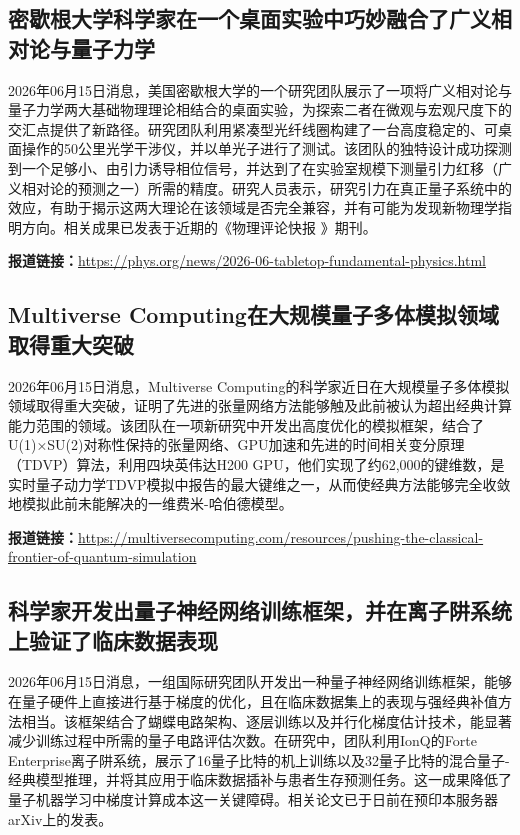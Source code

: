 \documentclass[12pt,a4paper]{ctexart}
\begin{document}
\subsection{ 密歇根大学科学家在一个桌面实验中巧妙融合了广义相对论与量子力学 }

2026年06月15日消息，美国密歇根大学的一个研究团队展示了一项将广义相对论与量子力学两大基础物理理论相结合的桌面实验，为探索二者在微观与宏观尺度下的交汇点提供了新路径。研究团队利用紧凑型光纤线圈构建了一台高度稳定的、可桌面操作的50公里光学干涉仪，并以单光子进行了测试。该团队的独特设计成功探测到一个足够小、由引力诱导相位信号，并达到了在实验室规模下测量引力红移（广义相对论的预测之一）所需的精度。研究人员表示，研究引力在真正量子系统中的效应，有助于揭示这两大理论在该领域是否完全兼容，并有可能为发现新物理学指明方向。相关成果已发表于近期的《物理评论快报 》期刊。

\noindent\textbf{报道链接：}\url{https://phys.org/news/2026-06-tabletop-fundamental-physics.html}

\subsection{ Multiverse Computing在大规模量子多体模拟领域取得重大突破 }

2026年06月15日消息，Multiverse Computing的科学家近日在大规模量子多体模拟领域取得重大突破，证明了先进的张量网络方法能够触及此前被认为超出经典计算能力范围的领域。该团队在一项新研究中开发出高度优化的模拟框架，结合了U(1)×SU(2)对称性保持的张量网络、GPU加速和先进的时间相关变分原理（TDVP）算法，利用四块英伟达H200 GPU，他们实现了约62,000的键维数，是实时量子动力学TDVP模拟中报告的最大键维之一，从而使经典方法能够完全收敛地模拟此前未能解决的一维费米-哈伯德模型。

\noindent\textbf{报道链接：}\url{https://multiversecomputing.com/resources/pushing-the-classical-frontier-of-quantum-simulation}

\subsection{ 科学家开发出量子神经网络训练框架，并在离子阱系统上验证了临床数据表现 }

2026年06月15日消息，一组国际研究团队开发出一种量子神经网络训练框架，能够在量子硬件上直接进行基于梯度的优化，且在临床数据集上的表现与强经典补值方法相当。该框架结合了蝴蝶电路架构、逐层训练以及并行化梯度估计技术，能显著减少训练过程中所需的量子电路评估次数。在研究中，团队利用IonQ的Forte Enterprise离子阱系统，展示了16量子比特的机上训练以及32量子比特的混合量子-经典模型推理，并将其应用于临床数据插补与患者生存预测任务。这一成果降低了量子机器学习中梯度计算成本这一关键障碍。相关论文已于日前在预印本服务器arXiv上的发表。
\end{document}
